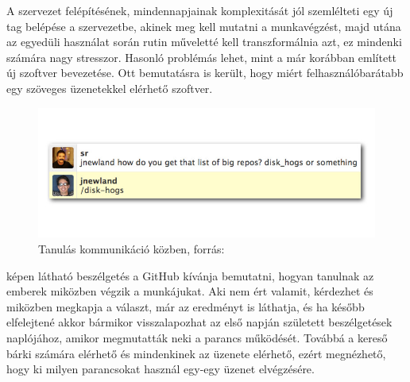 A szervezet felépítésének, mindennapjainak komplexitását jól szemlélteti egy új tag belépése a szervezetbe, akinek meg kell mutatni a munkavégzést, majd utána az egyedüli használat során rutin műveletté kell transzformálnia azt, ez mindenki számára nagy stresszor. Hasonló problémás lehet, mint a már korábban említett új szoftver bevezetése. Ott bemutatásra is került, hogy miért felhasználóbarátabb egy szöveges üzenetekkel elérhető szoftver.

\begin{figure}[ht]
  \centering
    \includegraphics[scale=.6]{assets/github_disk_how_is_it.png}%
    \caption[DUMMY]%
    {Tanulás kommunikáció közben, forrás: \cite[p.~65]{what_is_chatops_slideshow}}%
    \label{fig:learn_by_doing}
\end{figure}

 képen látható beszélgetés a GitHub kívánja bemutatni, hogyan tanulnak az emberek miközben végzik a munkájukat. Aki nem ért valamit, kérdezhet és miközben megkapja a választ, már az eredményt is láthatja, és ha később elfelejtené akkor bármikor visszalapozhat az első napján született beszélgetések naplójához, amikor megmutatták neki a parancs működését. Továbbá a kereső bárki számára elérhető és mindenkinek az üzenete elérhető, ezért megnézhető, hogy ki milyen parancsokat használ egy-egy üzenet elvégzésére.


